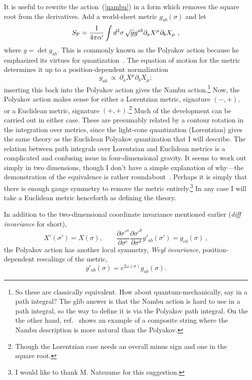 It is useful to rewrite the action~(\ref{nambu}) in a form which
removes the square root from the derivatives.  Add a world-sheet
metric
$g_{ab}(\sigma)$ and let
\begin{equation}
S_{\rm P} = \frac{1}{4\pi \alpha'} \int d^2 \sigma \,\sqrt{g}
g^{ab} \partial_a X^\mu \partial_b X_\mu \ , \label{poly}
\end{equation}
where $g = \det g_{ab}$.  This is commonly
known as the Polyakov action because he emphasized its virtues for
quantization~\cite{Poly1}.  The equation of motion for the metric
determines it up to a position-dependent normalization
\begin{equation}
g_{ab}\ \propto\ \partial_a X^\mu \partial_b X_\mu; \label{polnam}
\end{equation}
inserting this back into the Polyakov action gives the Nambu
action.\footnote{So these are classically equivalent.  How about
quantum-mechanically, say in a path integral?  The glib answer is
that the Nambu action is hard to use in a path integral, so the way
to define it is via the Polyakov path integral.  On the the other
hand, ref.~\cite{PolStr} shows an example of a composite string
where the Nambu description is more natural than the Polyakov.}
Now, the Polyakov
action makes sense for either a Lorentzian metric, signature
$(-,+)$, or a Euclidean metric, signature $(+,+)$.\footnote{Though
the Lorentzian case needs an overall minus sign and one in the
square root.}  Much of the development can be carried out in
either case.  These are presumably related by a contour rotation in
the integration over metrics, since the light-cone quantization
(Lorentzian) gives the same theory as the Euclidean Polyakov
quantization that I will describe.  The relation between path
integrals over Lorentzian and Euclidean metrics is a complicated
and confusing issue in four-dimensional gravity.  It seems to work
out simply in two dimensions, though I don't have a simple
explanation of why---the demonstration of the equivalence is rather
roundabout~\cite{DG}.  Perhaps it is simply that there is enough
gauge symmetry to remove the metric entirely.\footnote{I would like
to thank M. Natsuume for this suggestion.} In any case I will take a
Euclidean metric henceforth as defining the theory.

In addition to the two-dimensional coordinate invariance mentioned
earlier ({\it diff invariance} for short),
\begin{equation}
X'(\sigma') = X(\sigma), \qquad 
\frac{\partial \sigma'^a}{\partial \sigma^c}
\frac{\partial \sigma'^b}{\partial \sigma^d} g'_{ab}(\sigma') =
g_{cd}(\sigma)\ ,
\end{equation}
the Polyakov action has another local symmetry, {\it Weyl invariance},
position-dependent rescalings of the metric,
\begin{equation}
g'_{ab}(\sigma) = e^{2\omega(\sigma)} g_{ab}(\sigma).
\end{equation}


